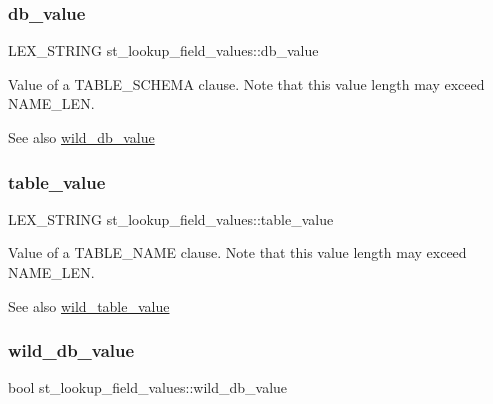 \subsubsection{\texorpdfstring{db\+\_\+value}{db\_value}}
{\footnotesize\ttfamily L\+E\+X\+\_\+\+S\+T\+R\+I\+NG st\+\_\+lookup\+\_\+field\+\_\+values\+::db\+\_\+value}

Value of a T\+A\+B\+L\+E\+\_\+\+S\+C\+H\+E\+MA clause. Note that this value length may exceed {\ttfamily N\+A\+M\+E\+\_\+\+L\+EN}. \begin{DoxySeeAlso}{See also}
\mbox{\hyperlink{structst__lookup__field__values_a696c94dd58f32374162948c5c97ddb02}{wild\+\_\+db\+\_\+value}} 
\end{DoxySeeAlso}
\mbox{\label{structst__lookup__field__values_a5ae61210774960f96b7da5bd6094bacf}} 
\subsubsection{\texorpdfstring{table\+\_\+value}{table\_value}}
{\footnotesize\ttfamily L\+E\+X\+\_\+\+S\+T\+R\+I\+NG st\+\_\+lookup\+\_\+field\+\_\+values\+::table\+\_\+value}

Value of a T\+A\+B\+L\+E\+\_\+\+N\+A\+ME clause. Note that this value length may exceed {\ttfamily N\+A\+M\+E\+\_\+\+L\+EN}. \begin{DoxySeeAlso}{See also}
\mbox{\hyperlink{structst__lookup__field__values_afc672c52a3286578c0edaee5676cf7fb}{wild\+\_\+table\+\_\+value}} 
\end{DoxySeeAlso}
\mbox{\label{structst__lookup__field__values_a696c94dd58f32374162948c5c97ddb02}} 
\subsubsection{\texorpdfstring{wild\+\_\+db\+\_\+value}{wild\_db\_value}}
{\footnotesize\ttfamily bool st\+\_\+lookup\+\_\+field\+\_\+values\+::wild\+\_\+db\+\_\+value}

